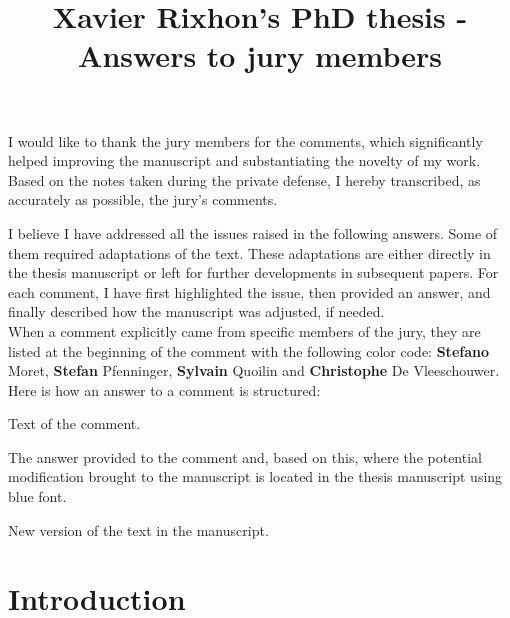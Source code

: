 \documentclass[12pt,a4paper]{article}
\title{\vspace{-1cm}
\begin{flushleft} {\sffamily Xavier Rixhon's PhD thesis - Answers to jury members}\end{flushleft}}
\date{\vspace{-1.7cm}\begin{flushleft}\sffamily Exploration of uncertainty-aware energy transition pathways - Reinforcement learning and principal component analysis-based methods\end{flushleft}}
\begin{document}
\maketitle

I would like to thank the jury members for the comments, which significantly helped improving the manuscript and substantiating the novelty of my work. Based on the notes taken during the private defense, I hereby transcribed, as accurately as possible, the jury's comments. 

I believe I have addressed all the issues raised in the following answers. Some of them required adaptations of the text. These adaptations are either directly in the thesis manuscript or left for further developments in subsequent papers. For each comment, I have first highlighted the issue, then provided an answer, and finally described how the manuscript was adjusted, if needed.\\

When a comment explicitly came from specific members of the jury, they are listed at the beginning of the comment with the following color code: {\color{orange} \textbf{Stefano} Moret}, {\color{teal} \textbf{Stefan} Pfenninger}, {\color{purple} \textbf{Sylvain} Quoilin} and {\color{violet} \textbf{Christophe} De Vleeschouwer}. Here is how an answer to a comment is structured:

\begin{mdframed}[style=comment] %
Text of the comment.
\end{mdframed}

\noindent The answer provided to the comment and, based on this, where the potential modification brought to the manuscript is located in the thesis manuscript using {\color{blue} blue font}.

\begin{mdframed}[style=manuscript] %
New version of the text in the manuscript.
\end{mdframed}

\clearpage

%
%
\section{Introduction}
\label{Introduction}
\end{document}
